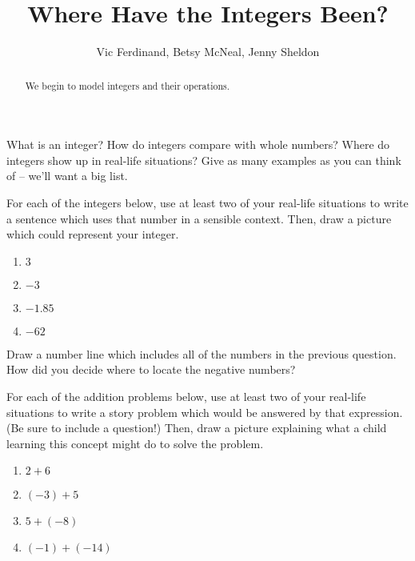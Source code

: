 \documentclass[nooutcomes]{ximera}
\title{Where Have the Integers Been?}
\author{Vic Ferdinand, Betsy McNeal, Jenny Sheldon}
\begin{document}
\begin{abstract}
    We begin to model integers and their operations.
\end{abstract}
\maketitle



\begin{problem}
What is an integer?  How do integers compare with whole numbers?  Where do integers show up in real-life situations?  Give as many examples as you can think of -- we'll want a big list.
\end{problem}

\begin{problem}
For each of the integers below, use at least two of your real-life situations to write a sentence which uses that number in a sensible context.  Then, draw a picture which could represent your integer.
\begin{enumerate}
    \item $3$
    \item $-3$
    \item $-1.85$
    \item $-62$
\end{enumerate}

\end{problem}

\begin{problem}
Draw a number line which includes all of the numbers in the previous question.  How did you decide where to locate the negative numbers?
\end{problem}

\begin{problem}
For each of the addition problems below, use at least two of your real-life situations to write a story problem which would be answered by that expression.  (Be sure to include a question!)  Then, draw a picture explaining what a child learning this concept might do to solve the problem.
\begin{enumerate}
    \item $2+6$
    \item $(-3) + 5$
    \item $5 + (-8)$
    \item $(-1) + (-14)$
\end{enumerate}

\end{problem}
\end{document}
